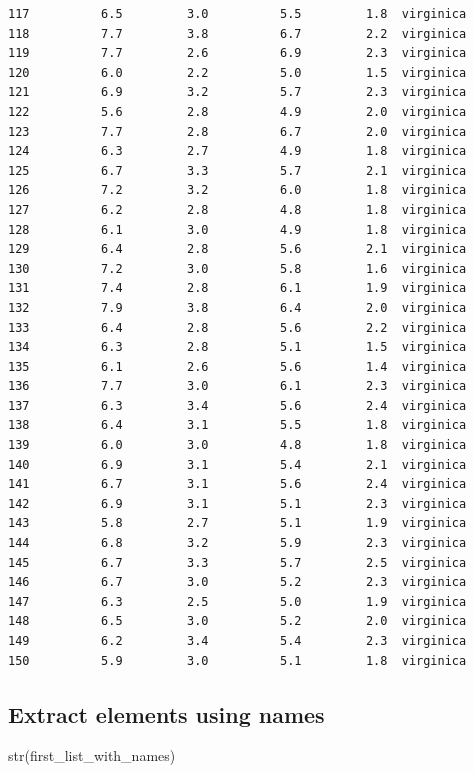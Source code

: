 \documentclass[
  letterpaper,
  DIV=11,
  numbers=noendperiod]{scrreprt}
\newenvironment{Shaded}{\begin{snugshade}}{\end{snugshade}}
\newcommand{\FunctionTok}[1]{\textcolor[rgb]{0.28,0.35,0.67}{#1}}
\newcommand{\NormalTok}[1]{\textcolor[rgb]{0.00,0.23,0.31}{#1}}
\begin{document}
\begin{verbatim}
117          6.5         3.0          5.5         1.8  virginica
118          7.7         3.8          6.7         2.2  virginica
119          7.7         2.6          6.9         2.3  virginica
120          6.0         2.2          5.0         1.5  virginica
121          6.9         3.2          5.7         2.3  virginica
122          5.6         2.8          4.9         2.0  virginica
123          7.7         2.8          6.7         2.0  virginica
124          6.3         2.7          4.9         1.8  virginica
125          6.7         3.3          5.7         2.1  virginica
126          7.2         3.2          6.0         1.8  virginica
127          6.2         2.8          4.8         1.8  virginica
128          6.1         3.0          4.9         1.8  virginica
129          6.4         2.8          5.6         2.1  virginica
130          7.2         3.0          5.8         1.6  virginica
131          7.4         2.8          6.1         1.9  virginica
132          7.9         3.8          6.4         2.0  virginica
133          6.4         2.8          5.6         2.2  virginica
134          6.3         2.8          5.1         1.5  virginica
135          6.1         2.6          5.6         1.4  virginica
136          7.7         3.0          6.1         2.3  virginica
137          6.3         3.4          5.6         2.4  virginica
138          6.4         3.1          5.5         1.8  virginica
139          6.0         3.0          4.8         1.8  virginica
140          6.9         3.1          5.4         2.1  virginica
141          6.7         3.1          5.6         2.4  virginica
142          6.9         3.1          5.1         2.3  virginica
143          5.8         2.7          5.1         1.9  virginica
144          6.8         3.2          5.9         2.3  virginica
145          6.7         3.3          5.7         2.5  virginica
146          6.7         3.0          5.2         2.3  virginica
147          6.3         2.5          5.0         1.9  virginica
148          6.5         3.0          5.2         2.0  virginica
149          6.2         3.4          5.4         2.3  virginica
150          5.9         3.0          5.1         1.8  virginica
\end{verbatim}

\subsection{Extract elements using
names}\label{extract-elements-using-names}

\begin{Shaded}
\begin{Highlighting}[]
\FunctionTok{str}\NormalTok{(first\_list\_with\_names)}
\end{Highlighting}
\end{Shaded}
\end{document}
